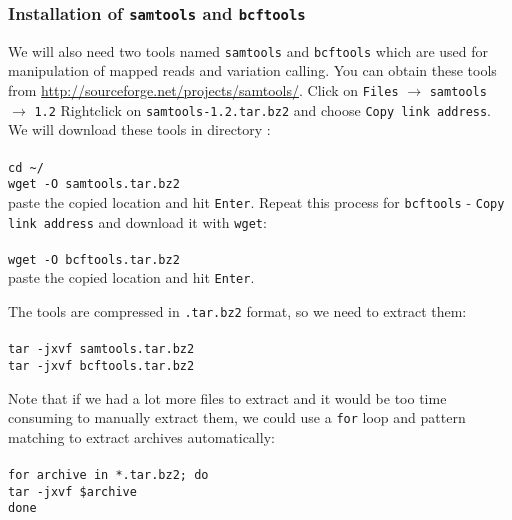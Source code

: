 \subsubsection{Installation of \texttt{samtools} and \texttt{bcftools}}
We will also need two tools named \texttt{samtools} and \texttt{bcftools} which are used for
manipulation of mapped reads and variation calling. You can obtain these tools from
\url{http://sourceforge.net/projects/samtools/}. Click on \texttt{Files} $\rightarrow$ \texttt{samtools} $\rightarrow$ \texttt{1.2}
Rightclick on \texttt{samtools-1.2.tar.bz2} and choose \texttt{Copy link address}. 
We will download these tools in directory \texttt{\progDir}:\\~\\
\texttt{cd \textasciitilde/\progDir}\\
\texttt{wget -O samtools.tar.bz2}\\

paste the copied location and hit \texttt{Enter}.
Repeat this process for \texttt{bcftools} - \texttt{Copy link address} and
download it with \texttt{wget}:\\~\\
\texttt{wget -O bcftools.tar.bz2}\\
paste the copied location and hit \texttt{Enter}.

The tools are compressed in \texttt{.tar.bz2}
format, so we need to extract them:\\~\\
\texttt{tar -jxvf samtools.tar.bz2}\\
\texttt{tar -jxvf bcftools.tar.bz2}\\

\begin{framed}
Note that if we had a lot more files to extract and it would be too
time consuming to manually extract them, we could use a \texttt{for}
loop and pattern matching to extract archives automatically:\\~\\
\texttt{for archive in *.tar.bz2; do}\\
\texttt{\indent tar -jxvf \$archive}\\
\texttt{done}
\end{framed}

